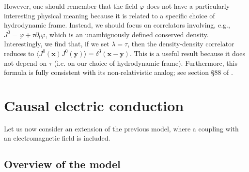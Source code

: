 \documentclass[a4paper, amsfonts, amssymb, amsmath, reprint, showkeys, nofootinbib, twoside,notitlepage,onecolumn,preprintnumbers]{revtex4-2}
\theoremstyle{definition}
\theoremstyle{theorem}
\theoremstyle{corollary}
\begin{document}
However, one should remember that the field $\varphi$ does not have a particularly interesting physical meaning because it is related to a specific choice of hydrodynamic frame. Instead, we should focus on correlators involving, e.g., $J^0 {=} \varphi {+}\tau \partial_t \varphi$, which is an unambiguously defined conserved density. Interestingly, we find that, if we set $\lambda{=}\tau$, then the density-density correlator reduces to $\langle J^0(\textbf{x})  J^0(\textbf{y}) \rangle= \delta^3(\textbf{x}{-}\textbf{y})$. This is a useful result because it does not depend on $\tau$ (i.e. on our choice of hydrodynamic frame). Furthermore, this formula is fully consistent with its non-relativistic analog; see section \S 88 of \cite{landau9}.

\section{Causal electric conduction}\label{Electro!}

Let us now consider an extension of the previous model, where a coupling with an electromagnetic field is included.

\subsection{Overview of the model}
\end{document}
